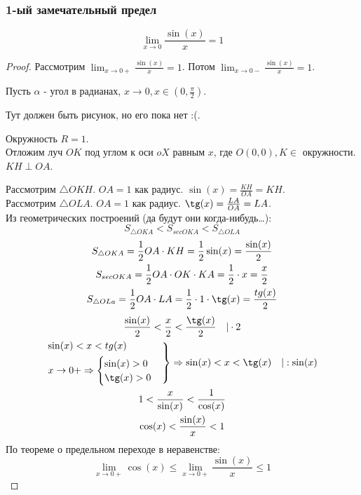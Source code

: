 \subsubsection*{1-ый замечательный предел}

\begin{theorem}
  \[
  \lim_{x \to 0} \frac{\sin(x)}{x} = 1
  \]  
\end{theorem}
\begin{proof}
  Рассмотрим $\lim_{x \to 0+} \frac{\sin(x)}{x} = 1$. Потом $\lim_{x \to 0-} \frac{\sin(x)}{x} = 1$. 
  
  Пусть $\alpha$ - угол в радианах, $x \to 0, x \in (0, \frac{\pi}{2})$.

  Тут должен быть рисунок, но его пока нет :(.

  Окружность $R = 1$.\\
  Отложим луч $OK$ под углом к оси $oX$ равным $x$, где $O(0, 0), K \in $ окружности. \\
  $KH \perp OA$.

  Рассмотрим $\triangle OKH$. $OA = 1$ как радиус. $\sin(x) = \frac{KH}{OA} = KH$. \\
  Рассмотрим $\triangle OLA$. $OA = 1$ как радиус. $\tg(x) = \frac{LA}{OA} = LA$. \\
  Из геометрических построений (да будут они когда-нибудь\ldots): \[
    S_{\triangle OKA} < S_{sec OKA} < S_{\triangle OLA}
  \] 
  \begin{gather*}
    S_{\triangle OKA} = \frac{1}{2} OA \cdot KH = \frac{1}{2} \sin(x) = \frac{\sin(x)}{2} \\
    S_{sec OKA} = \frac{1}{2} OA \cdot OK \cdot KA = \frac{1}{2} \cdot x = \frac{x}{2} \\
    S_{\triangle OLa} = \frac{1}{2} OA \cdot LA = \frac{1}{2} \cdot 1 \cdot \tg(x) = \frac{tg(x)}{2}
  \end{gather*}
  \begin{gather*}
    \frac{\sin(x)}{2} < \frac{x}{2} < \frac{\tg(x)}{2} \quad | \cdot 2 \\
    \begin{rcases}
      \sin(x) < x < tg(x) \\
      x \to 0+ \implies \begin{cases}
        \sin(x) > 0 \\
        \tg(x) > 0
      \end{cases}
    \end{rcases} \implies 
    \sin(x) < x < \tg(x) \quad | : \sin(x) \\
    1 < \frac{x}{\sin(x)} < \frac{1}{\cos(x)} \\
    \cos(x) < \frac{\sin(x)}{x} < 1
  \end{gather*}
   По теореме о предельном переходе в неравенстве: \[
   \lim_{x \to 0+} \cos(x) \le \lim_{x \to 0+} \frac{\sin(x)}{x} \le 1
   \] 


\end{proof}
